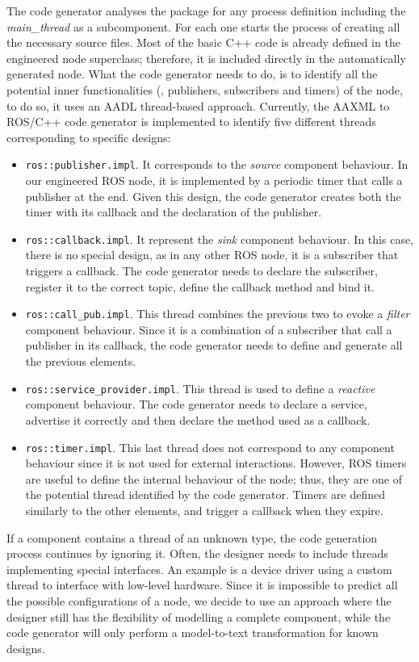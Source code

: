 The code generator analyses the package for any process definition including the \textit{main\_thread} as a subcomponent. For each one starts the process of creating all the necessary source files. Most of the basic C++ code is already defined in the engineered node superclass; therefore, it is included directly in the automatically generated node. What the code generator needs to do, is to identify all the potential inner functionalities (\ie, publishers, subscribers and timers) of the node, to do so, it uses an AADL thread-based approach. Currently, the AAXML to ROS/C++ code generator is implemented to identify five different threads corresponding to specific designs:
\begin{itemize}
\item \texttt{ros::publisher.impl}. It corresponds to the \textit{source} component behaviour. In our engineered ROS node, it is implemented by a periodic timer that calls a publisher at the end. Given this design, the code generator creates both the timer with its callback and the declaration of the publisher.
\item \texttt{ros::callback.impl}. It represent the \textit{sink} component behaviour. In this case, there is no special design, as in any other ROS node, it is a subscriber that triggers a callback. The code generator needs to declare the subscriber, register it to the correct topic, define the callback method and bind it.
\item \texttt{ros::call\_pub.impl}. This thread combines the previous two to evoke a \textit{filter} component behaviour. Since it is a combination of a subscriber that call a publisher in its callback, the code generator needs to define and generate all the previous elements.
\item \texttt{ros::service\_provider.impl}. This thread is used to define a \textit{reactive} component behaviour. The code generator needs to declare a service, advertise it correctly and then declare the method used as a callback.
\item \texttt{ros::timer.impl}. This last thread does not correspond to any component behaviour since it is not used for external interactions. However, ROS timers are useful to define the internal behaviour of the node; thus, they are one of the potential thread identified by the code generator. Timers are defined similarly to the other elements, and trigger a callback when they expire.
\end{itemize}
If a component contains a thread of an unknown type, the code generation process continues by ignoring it. Often, the designer needs to include threads implementing special interfaces. An example is a device driver using a custom thread to interface with low-level hardware. Since it is impossible to predict all the possible configurations of a node, we decide to use an approach where the designer still has the flexibility of modelling a complete component, while the code generator will only perform a model-to-text transformation for known designs.

